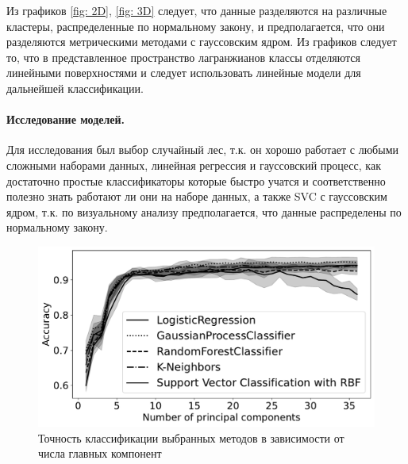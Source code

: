 \documentclass[12pt, twoside]{article}
\begin{document}
Из графиков \ref{fig: 2D}, \ref{fig: 3D} следует, что данные разделяются на различные кластеры, распределенные по нормальному закону, и предполагается, что они разделяются метрическими методами с гауссовским ядром. Из графиков следует то, что в представленное пространство лагранжианов классы отделяются линейными поверхностями и следует использовать линейные модели для дальнейшей классификации.
\newpage
\paragraph{Исследование моделей.}Для исследования был выбор случайный лес, т.к. он хорошо работает с любыми сложными наборами данных, линейная регрессия и гауссовский процесс, как достаточно простые классификаторы которые быстро учатся и соответственно полезно знать работают ли они на наборе данных, а также SVC с гауссовским ядром, т.к. по визуальному анализу предполагается, что данные распределены по нормальному закону.


\begin{figure}[H]
 \centering
 \includegraphics[scale = 0.7]{Accuracy.pdf}
 \caption{Точность классификации выбранных методов в зависимости от числа главных компонент}
 \label{fig: Accuracy}
\end{figure}
\end{document}
